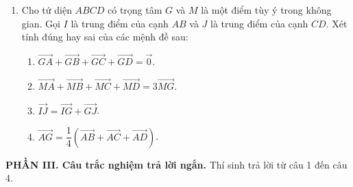 \documentclass[12pt]{article}
\begin{document}
\begin{enumerate}[label=\textbf{Câu \arabic*.}, leftmargin=*]
		\vspace{4mm}
		\item Cho tứ diện $ABCD$ có trọng tâm $G$ và $M$ là một điểm tùy ý trong không gian. Gọi $I$ là trung điểm của cạnh $AB$ và $J$ là trung điểm của cạnh $CD$. Xét tính đúng hay sai của các mệnh đề sau:
		\begin{enumerate}[label=\alph*)]
			\item $\overrightarrow{GA} + \overrightarrow{GB} + \overrightarrow{GC} + \overrightarrow{GD} = \vec{0}$.
			\item $\overrightarrow{MA} + \overrightarrow{MB} + \overrightarrow{MC} + \overrightarrow{MD} = 3\overrightarrow{MG}$.
			\item $\overrightarrow{IJ} = \overrightarrow{IG} + \overrightarrow{GJ}$.
			\item $\overrightarrow{AG} = \dfrac{1}{4} \left( \overrightarrow{AB} + \overrightarrow{AC} + \overrightarrow{AD} \right)$.
		\end{enumerate}
	\end{enumerate}
	
	\noindent\textbf{PHẦN III. Câu trắc nghiệm trả lời ngắn.} Thí sinh trả lời từ câu 1 đến câu 4.
	\vspace{2mm}
	
\end{document}
